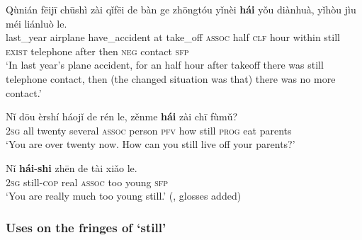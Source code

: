 \begin{exe}
	\ex 
	\gll Qùnián fēijī chūshì zài qǐfēi de bàn ge zhōngtóu yǐnèi \textbf{hái} yǒu diànhuà, yǐhòu jìu méi liánluò le.\\
	last\_year airplane have\_accident at take\_off \textsc{assoc} half \textsc{clf} hour within still \textsc{exist} telephone after then \textsc{neg} contact \textsc{sfp}\\
	\glt \lq In last year's plane accident, for an half hour after takeoff there was still telephone contact, then (the changed situation was that) there was no more contact.' \parencite[259]{LiThompson1981}
		\ex

\gll Nǐ 	dōu	èrshí	háojǐ	de	rén	le,	zěnme		\textbf{hái}	zài	chī	fùmǔ?\\
	2\textsc{sg} all twenty several \textsc{assoc} person \textsc{pfv} how still \textsc{prog} eat parents\\
	\glt \lq You are over twenty now. How can you still live off your parents?\rq{ }\parencite[84]{Li2016}
		
	\ex \label{exAppendixMandarin4}
	\gll Nǐ \textbf{hái}-\textbf{shi} zhēn de tài xiǎo le.\\
	2\textsc{sg} still-\textsc{cop} real \textsc{assoc} too young \textsc{sfp}\\
	\glt \lq You are really much too young still.\rq{ }(\cite[339]{Wiedenhof2015}, glosses added)
\end{exe}


\subsubsection{Uses on the fringes of \lq{}still\rq{}}
